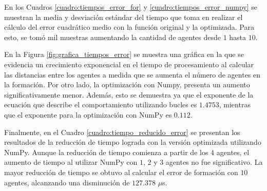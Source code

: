 En los Cuadros \ref{cuadro:tiempos_error_for} y \ref{cuadro:tiempos_error_numpy} se muestran la media y desviación estándar del tiempo que toma en realizar el cálculo del error cuadrático medio con la función original y la optimizada. Para esto, se tomó mil muestras aumentando la cantidad de agentes desde $1$ hasta $10$. 

En la Figura \ref{fig:grafica_tiempos_error} se muestra una gráfica en la que se evidencia un crecimiento exponencial en el tiempo de procesamiento al calcular las distancias entre los agentes a medida que se aumenta el número de agentes en la formación. Por otro lado, la optimización con Numpy, presenta un aumento significativamente menor. Además, esto se demuestra ya que el exponente de la ecuación que describe el comportamiento utilizando bucles es $1.4753$, mientras que el exponente para la optimización con NumPy es $0.112$.

Finalmente, en el Cuadro \ref{cuadro:tiempo_reducido_error} se presentan los resultados de la reducción de tiempo lograda con la versión optimizada utilizando NumPy. Aunque la reducción de tiempo comienza a partir de los $4$ agentes, el aumento de tiempo al utilizar NumPy con $1$, $2$ y $3$ agentes no fue significativo. La mayor reducción de tiempo se obtuvo al calcular el error de formación con $10$ agentes, alcanzando una disminución de $127.378$ $\mu$s.

